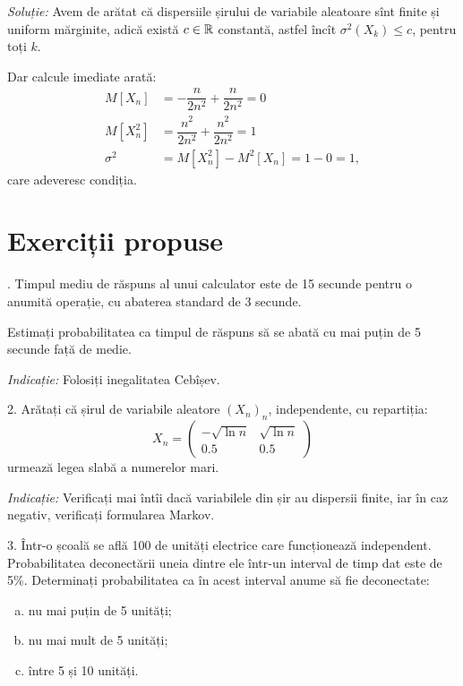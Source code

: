 \emph{Soluție:} Avem de arătat că dispersiile șirului de variabile aleatoare
sînt finite și uniform mărginite, adică există $ c \in \mathbb{R} $ constantă,
astfel încît $ \sigma^2(X_k) \leq c $, pentru toți $ k $.

Dar calcule imediate arată:
\begin{align*}
  M[X_n] &= -\dfrac{n}{2n^2} + \dfrac{n}{2n^2} = 0 \\
  M[X^2_n] &= \dfrac{n^2}{2n^2} + \dfrac{n^2}{2n^2} = 1 \\
  \sigma^2 &= M[X_n^2] - M^2[X_n] = 1 - 0 = 1,
\end{align*}
care adeveresc condiția.

\section{Exerciții propuse}

\indent{}. Timpul mediu de răspuns al unui calculator este de 15 secunde pentru o
anumită operație, cu abaterea standard de 3 secunde.

Estimați probabilitatea ca timpul de răspuns să se abată cu mai puțin de
5 secunde față de medie.

\emph{Indicație:} Folosiți inegalitatea Cebîșev.

\vspace{0.3cm}

2. Arătați că șirul de variabile aleatore $ (X_n)_n $, independente, cu
repartiția:
\[
  X_n = \begin{pmatrix}
    -\sqrt{\ln n} & \sqrt{\ln n} \\
    0.5 & 0.5
  \end{pmatrix}
\]
urmează legea slabă a numerelor mari.

\emph{Indicație:} Verificați mai întîi dacă variabilele din șir au dispersii
finite, iar în caz negativ, verificați formularea Markov.

\vspace{0.3cm}

3. Într-o școală se află 100 de unități electrice care funcționează
independent. Probabilitatea deconectării uneia dintre ele într-un interval de
timp dat este de 5\%. Determinați probabilitatea ca în acest interval anume
să fie deconectate:
\begin{enumerate}[(a)]
\item nu mai puțin de 5 unități;
\item nu mai mult de 5 unități;
\item între 5 și 10 unități.
\end{enumerate}

